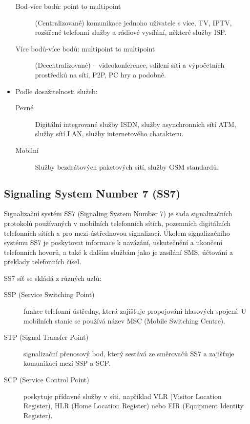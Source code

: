 \begin{itemize}
\begin{description}
              \item[Bod-více bodů: point to multipoint] (Centralizované) komunikace jednoho uživatele s více, TV, IPTV, rozšířené telefonní služby a rádiové vysílání, některé služby ISP.
              \item[Více bodů-více bodů: multipoint to multipoint] (Decentralizované) -- videokonference, sdílení sítí a výpočetních prostředků na síti, P2P, PC hry a podobně.
          \end{description}
    \item Podle dosažitelnosti služeb:
          \begin{description}
              \item[Pevné] Digitální integrované služby ISDN, služby asynchronních sítí ATM, služby sítí LAN, služby internetového charakteru.
              \item[Mobilní] Služby bezdrátových paketových sítí, služby GSM standardů.
          \end{description}
\end{itemize}

\subsection{Signaling System Number 7 (SS7)}
Signalizační systém SS7 (Signaling System Number 7) je sada signalizačních protokolů používaných v mobilních telefonních sítích, pozemních digitálních telefonních sítích a pro mezi-ústřednovou signalizaci. Úkolem signalizačního systému SS7 je poskytovat informace k navázání, uskutečnění a ukončení telefonních hovorů, a také k dalším službám jako je zasílání SMS, účtování a překlady telefonních čísel.

SS7 síť se skládá z různých uzlů:
\begin{description}
    \item[SSP (Service Switching Point)] funkce telefonní ústředny, která zajišťuje propojování hlasových spojení. U mobilních stanic se používá název MSC (Mobile Switching Centre).
    \item[STP (Signal Transfer Point)] signalizační přenosový bod, který sestává ze směrovačů SS7 a zajišťuje komunikaci mezi SSP a SCP.
    \item[SCP (Service Control Point)] poskytuje přídavné služby v síti, například VLR (Visitor Location Register), HLR (Home Location Register) nebo EIR (Equipment Identity Register).
\end{description}

